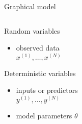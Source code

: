 \begin{frame}{Graphical model}

\begin{columns}
\begin{column}{0.6\textwidth}

Random variables
\begin{itemize}
	\item observed data \\
	$x^{(1)}, \ldots, x^{(N)}$
\end{itemize}

Deterministic variables
\begin{itemize}
	\item inputs or predictors \\
	$y^{(1)}, \ldots, y^{(N)}$
	\item model parameters $\theta$
\end{itemize}

\end{column}
\begin{column}{0.2\textwidth}
\end{column}

\end{columns}


\end{frame}


